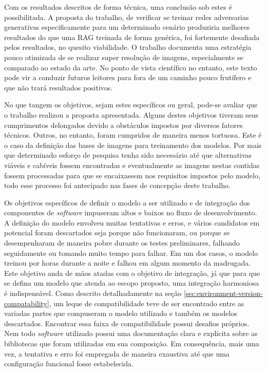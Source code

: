 Com os resultados descritos de forma técnica, uma conclusão sob estes é possibilitada. A proposta do trabalho, de verificar se treinar redes adversarias generativas especificamente para um determinado cenário produziria melhores resultados do que uma RAG treinada de forma genérica, foi fortemente desafiada pelos resultados, no quesito viabilidade. O trabalho documenta uma estratégia pouco otimizada de se realizar super resolução de imagens, especialmente se comparado ao estado da arte. No ponto de vista científico no entanto, este texto pode vir a conduzir futuros leitores para fora de um caminho pouco frutífero e que não trará resultados positivos. 

No que tangem os objetivos, sejam estes específicos ou geral, pode-se avaliar que o trabalho realizou a proposta apresentada. Alguns destes objetivos tiveram seus cumprimentos delongados devido a obstáculos impostos por diversos fatores técnicos. Outros, no entanto, foram cumpridos de maneira menos tortuosa. Este é o caso da definição das bases de imagens para treinamento dos modelos. Por mais que determinado esforço de pesquisa tenha sido necessário até que alternativas viáveis e cabíveis fossem encontradas e eventualmente as imagens nestas contidas fossem processadas para que se encaixassem nos requisitos impostos pelo modelo, todo esse processo foi antecipado nas fases de concepção deste trabalho.

Os objetivos específicos de definir o modelo a ser utilizado e de integração dos componentes de \textit{software} impuseram altos e baixos no fluxo de desenvolvimento. A definição do modelo envolveu muitas tentativas e erros, e vários candidatos em potencial foram descartados seja porque não funcionaram, ou porque se desempenharam de maneira pobre durante os testes preliminares, falhando seguidamente ou tomando muito tempo para falhar. Em um dos casos, o modelo treinou por horas durante a noite e falhou em algum momento da madrugada. Este objetivo anda de mãos atadas com o objetivo de integração, já que para que se defina um modelo que atenda ao escopo proposto, uma integração harmoniosa é indispensável. Como descrito detalhadamente na seção \ref{sec:environment-version-compatability}, um leque de compatibilidade teve de ser encontrado entre as variadas partes que compuseram o modelo utilizado e também os modelos descartados. Encontrar essa faixa de compatibilidade possui desafios próprios. Nem todo \textit{software} utilizado possui uma documentação clara e explícita sobre as bibliotecas que foram utilizadas em sua composição. Em consequência, mais uma vez, a tentativa e erro foi empregada de maneira exaustiva até que uma configuração funcional fosse estabelecida.

